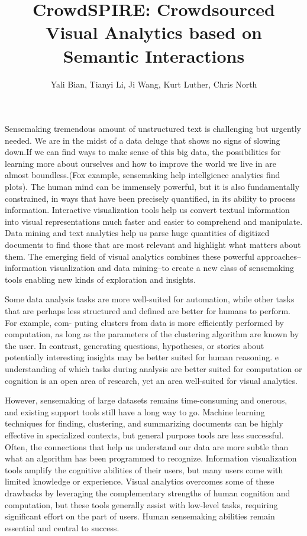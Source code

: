 \documentclass[journal]{vgtc}                %
\title{CrowdSPIRE: Crowdsourced Visual Analytics based on Semantic Interactions}
\author{Yali Bian, Tianyi Li, Ji Wang, Kurt Luther, Chris North}
\begin{document}
\maketitle
Sensemaking tremendous amount of unstructured text is challenging but urgently needed. We are in the midst of a data deluge that shows no signs of slowing down.If we can find ways to make sense of this big data, the possibilities for learning more about ourselves and how to improve the world we live in are almost boundless.(Fox example, sensemaking help intellgience analytics find plots).
The human mind can be immensely powerful, but it is also fundamentally constrained, in ways that have been precisely quantified, in its ability to process information.
Interactive visualization tools help us convert textual information into visual representations much faster and easier to comprehend and manipulate. Data mining and text analytics help us parse huge quantities of digitized documents to find those that are most relevant and highlight what matters about them. The emerging field of visual analytics combines these powerful approaches--information visualization and data mining--to create a new class of sensemaking tools enabling new kinds of exploration and insights.

Some data analysis tasks are more well-suited for automation, while other tasks that are perhaps less structured and defined are better for humans to perform. For example, com- puting clusters from data is more efficiently performed by computation, as long as the parameters of the clustering algorithm are known by the user. In contrast, generating questions, hypotheses, or stories about potentially interesting insights may be better suited for human reasoning. e understanding of which tasks during analysis are better suited for computation or cognition is an open area of research, yet an area well-suited for visual analytics.

However, sensemaking of large datasets remains time-consuming and onerous, and existing support tools still have a long way to go.
Machine learning techniques for finding, clustering, and summarizing documents can be highly effective in specialized contexts, but general purpose tools are less successful.
Often, the connections that help us understand our data are more subtle than what an algorithm has been programmed to recognize.
Information visualization tools amplify the cognitive abilities of their users, but many users come with limited knowledge or experience.
Visual analytics overcomes some of these drawbacks by leveraging the complementary strengths of human cognition and computation, but these tools generally assist with low-level tasks, requiring significant effort on the part of users.
Human sensemaking abilities remain essential and central to success.
\end{document}
